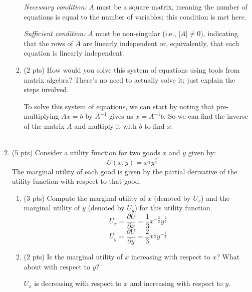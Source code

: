 \documentclass{./../../Latex/tests}
\begin{document}
\begin{enumerate}
\begin{enumerate}
\textit{Necessary condition:} $A$ must be a square matrix, meaning the number of equations is equal to the number of variables; this condition is met here.

\textit{Sufficient condition:} $A$ must be non-singular (i.e., $|A| \neq 0$), indicating that the rows of $A$ are linearly independent or, equivalently, that each equation is linearly independent. \\

\item (2 pts) How would you solve this system of equations using tools from matrix algebra? There's no need to actually solve it; just explain the steps involved.

To solve this system of equations, we can start by noting that pre-multiplying $Ax =b$ by $A^{-1}$ gives us $x = A^{-1} b$. So we can find the inverse of the matrix $A$ and multiply it with $b$ to find $x$. \\~\\
\end{enumerate}


\item (5 pts) Consider a utility function for two goods \( x \) and \( y \) given by:
\[
U(x, y) = x^{\frac{1}{3}}y^{\frac{2}{3}}
\]
The marginal utility of each good is given by the partial derivative of the utility function with respect to that good.
\begin{enumerate}
  \item (3 pts) Compute the marginal utility of \( x \) (denoted by \( U_x \)) and the marginal utility of \( y \) (denoted by \( U_y \)) for this utility function.
  \[
  U_x = \frac{\partial U}{\partial x} = \frac{1}{3} x^{-\frac{2}{3}} y^{\frac{2}{3}}
  \]
   \[
  U_y = \frac{\partial U}{\partial y} = \frac{2}{3} x^{\frac{1}{3}} y^{-\frac{1}{3}}
  \]
  \item (2 pts) Is the marginal utility of \( x \) increasing with respect to \( x \)? What about with respect to \( y \)?
  
  $U_x$ is decreasing with respect to \( x \) and increasing with respect to \( y \).
\end{enumerate}


\end{enumerate}
\end{document}
